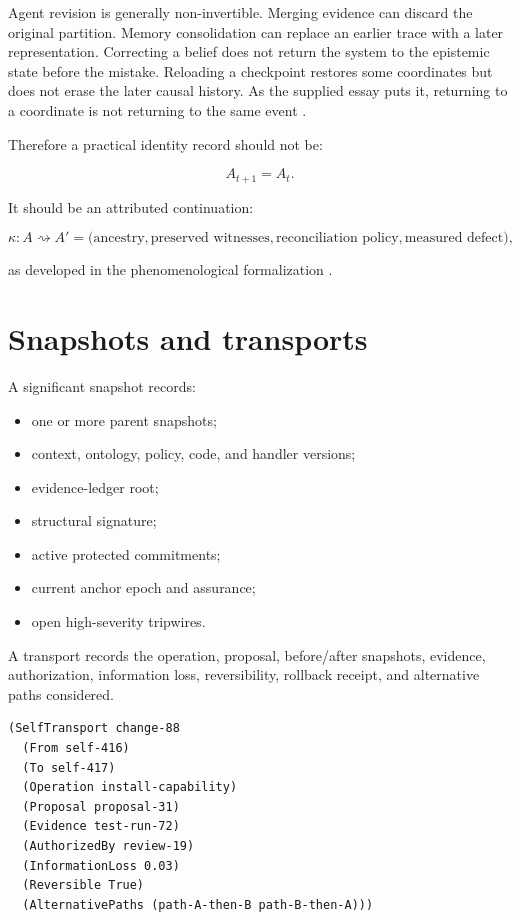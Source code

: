 \documentclass[11pt,oneside]{report}
\begin{document}
Agent revision is generally non-invertible. Merging evidence can discard the original partition. Memory consolidation can replace an earlier trace with a later representation. Correcting a belief does not return the system to the epistemic state before the mistake. Reloading a checkpoint restores some coordinates but does not erase the later causal history. As the supplied essay puts it, returning to a coordinate is not returning to the same event \cite{path-essay}.

Therefore a practical identity record should not be:

\[
A_{t+1}=A_t.
\]

It should be an attributed continuation:

\[
\kappa:A\rightsquigarrow A'
=\bigl(
\text{ancestry},
\text{preserved witnesses},
\text{reconciliation policy},
\text{measured defect}
\bigr),
\]

as developed in the phenomenological formalization \cite{phenom-form}.

\section{Snapshots and transports}

A significant snapshot records:

\begin{itemize}
  \item one or more parent snapshots;
  \item context, ontology, policy, code, and handler versions;
  \item evidence-ledger root;
  \item structural signature;
  \item active protected commitments;
  \item current anchor epoch and assurance;
  \item open high-severity tripwires.
\end{itemize}

A transport records the operation, proposal, before/after snapshots, evidence, authorization, information loss, reversibility, rollback receipt, and alternative paths considered.

\begin{lstlisting}[language=Metta,caption={Illustrative directed transport}]
(SelfTransport change-88
  (From self-416)
  (To self-417)
  (Operation install-capability)
  (Proposal proposal-31)
  (Evidence test-run-72)
  (AuthorizedBy review-19)
  (InformationLoss 0.03)
  (Reversible True)
  (AlternativePaths (path-A-then-B path-B-then-A)))
\end{lstlisting}
\end{document}
